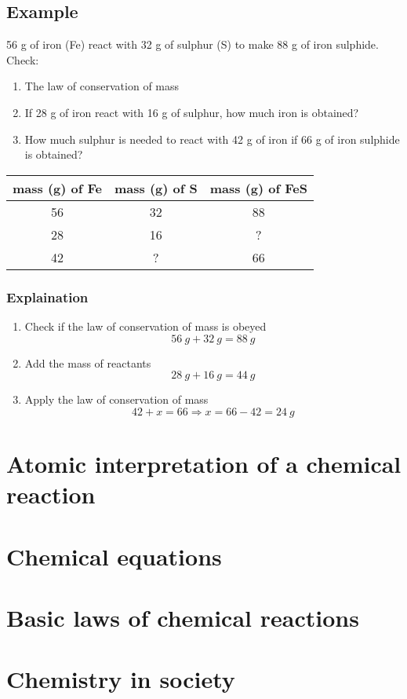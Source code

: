 \documentclass{article}
\begin{document}
		\subsection*{Example}
		
			56 g of iron (Fe) react with 32 g of sulphur (S) to make 88 g of iron sulphide. Check:
			\begin{enumerate}
				\item The law of conservation of mass
				\item If 28 g of iron react with 16 g of sulphur, how much iron is obtained?
				\item How much sulphur is needed to react with 42 g of iron if 66 g of iron sulphide is obtained?
			\end{enumerate}
		
			\begin{center}
			\end{center}
		
			\begin{table}[htp]
				\centering
					\begin{tabular}{@{}ccc@{}}
						\toprule
 							mass (g) of Fe & mass (g) of S & mass (g) of FeS \\ \midrule
 							56 & 32  & 88 \\
 							28 & 16  & ? \\
 							42 & ? & 66 \\ \bottomrule
					\end{tabular}
			\end{table}
			
			\subsubsection*{Explaination}
				\begin{enumerate}
					\item Check if the law of conservation of mass is obeyed
					\[ 56\ g + 32\ g = 88\ g \]
					\item Add the mass of reactants
					\[ 28\ g + 16\ g = 44\ g \]
					\item Apply the law of conservation of mass
					\[ 42 + x = 66 \Longrightarrow x = 66 - 42 = 24\ g  \]
				\end{enumerate}

		
	
	
	\section{Atomic interpretation of a chemical reaction}
	
	\section{Chemical equations}
	
	\section{Basic laws of chemical reactions}
	
	\section{Chemistry in society}
\end{document}
